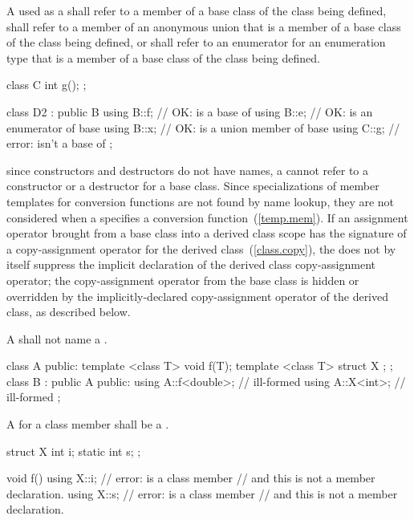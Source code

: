 \pnum
A  used as a 
shall refer to a member of a base class of the class being defined, shall
refer to a member of an anonymous union that is a member of a base class
of the class being defined, or shall refer to an enumerator for an
enumeration type that is a member of a base class of the class being defined.
\enterexample

\begin{codeblock}
class C {
	int g();
};

class D2 : public B {
	using B::f;             // OK:  is a base of 
	using B::e;             // OK:  is an enumerator of base 
	using B::x;             // OK:  is a union member of base 
	using C::g;		// error:  isn't a base of 
};
\end{codeblock}
\exitexampleb
\enternote
since constructors and destructors do not have names, a
 cannot refer to a constructor or a
destructor for a base class. Since specializations of member templates
for conversion functions are not found by name lookup, they are not
considered when a  specifies a conversion
function~(\ref{temp.mem}).
\exitnote
If an assignment operator brought from a base class into a derived class
scope has the signature of a copy-assignment operator for the derived
class~(\ref{class.copy}), the  does not by
itself suppress the implicit declaration of the derived class
copy-assignment operator; the copy-assignment operator from the base
class is hidden or overridden by the implicitly-declared
copy-assignment operator of the derived class, as described below.

\pnum
A  shall not name a .
\enterexample

\begin{codeblock}
class A {
public:
	template <class T> void f(T);
	template <class T> struct X { };
};
class B : public A {
public:
	using A::f<double>;     // ill-formed
	using A::X<int>;        // ill-formed
};
\end{codeblock}
\exitexampleb

\pnum
A  for a class member shall be a
.
\enterexample

\begin{codeblock}
struct X {
	int i;
	static int s;
};

void f()
{
	using X::i;		// error:  is a class member
				// and this is not a member declaration.
	using X::s;		// error:  is a class member
				// and this is not a member declaration.
}
\end{codeblock}
\exitexampleb

